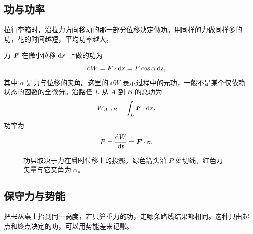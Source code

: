 \subsection{功与功率}

拉行李箱时，沿拉力方向移动的那一部分位移决定做功。用同样的力做同样多的功，花的时间越短，平均功率越大。

力 $\boldsymbol{F}$ 在微小位移 $\mathrm{d}\boldsymbol{r}$ 上做的功为
\begin{equation}
\mathrm{d} W=\boldsymbol{F}\cdot\mathrm{d}\boldsymbol{r}=F\cos\alpha\,\mathrm{d} s,
\end{equation}
其中 $\alpha$ 是力与位移的夹角。这里的 $\dd W$ 表示过程中的元功，一般不是某个仅依赖状态的函数的全微分。沿路径 $L$ 从 $A$ 到 $B$ 的总功为
\begin{equation}
W_{A\to B}=\int_L \boldsymbol{F}\cdot\mathrm{d}\boldsymbol{r} .
\label{eq:work}
\end{equation}
功率为
\begin{equation}
P=\frac{\mathrm{d} W}{\mathrm{d} t}=\boldsymbol{F}\cdot\boldsymbol{v} .
\end{equation}

\begin{figure}[htbp]
\centering
{}
\caption{功只取决于力在瞬时位移上的投影。绿色箭头沿 $P$ 处切线，红色力矢量与它夹角为 $\alpha$。}
\label{fig:work}
\end{figure}

\subsection{保守力与势能}

把书从桌上抬到同一高度，若只算重力的功，走哪条路线结果都相同。这种只由起点和终点决定的功，可以用势能差来记账。

